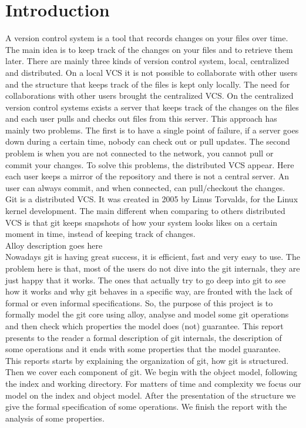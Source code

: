 \section{Introduction}

A \Gls{version control system} is a tool that records changes on your
files over time. The main idea is to keep track of the changes on your
files and to retrieve them later. There are mainly three kinds of 
\Gls{version control system}, local, centralized and distributed. On
a local VCS it is not possible to collaborate with other users and
the structure that keeps track of the files is kept only locally. The
need for collaborations with other users brought the centralized VCS.
On the centralized version control systems exists a server that keeps
track of the changes on the files and each user pulls and checks out files
from this server. This approach has mainly two problems. The
first is to have a single point of failure, if a server goes down
during a certain time, nobody can check out or pull updates. The
second problem is when you are not connected to the network, you
cannot pull or commit your changes. To solve this problems, the
distributed VCS appear. Here each user keeps a mirror of the
repository and there is not a central server. An user can always commit,
and when connected, can pull/checkout the changes.\\
Git is a distributed VCS. It was created in 2005 by Linus Torvalds,
for the Linux kernel development. The main different when comparing to
others distributed VCS is that git keeps snapshots of how your system
looks likes on a certain moment in time, instead of keeping track of
changes.\\
Alloy description goes here\\
Nowadays git is having great success, it is efficient, fast and very
easy to use. The problem here is that, most of the users do not dive
into the git internals, they are just happy that it works. The ones
that actually try to go deep into git to see how it works and why git
behaves in a specific way, are fronted with the lack of formal or even
informal specifications.  So, the purpose of this project is to
formally model the git core using alloy, analyse and model some git
operations and then check which properties the model does (not)
guarantee. This report presents to the reader a formal description of
git internals, the description of some operations and it ends with
some properties that the model guarantee.\\
This reports starts by explaining the organization of git, how git is
structured. Then we cover each component of git. We begin with the
object model, following the index and working directory. For matters
of time and complexity we focus our model on the index and object
model. After the presentation of the structure we give the formal
specification of some operations. We finish the report with the
analysis of some properties.


